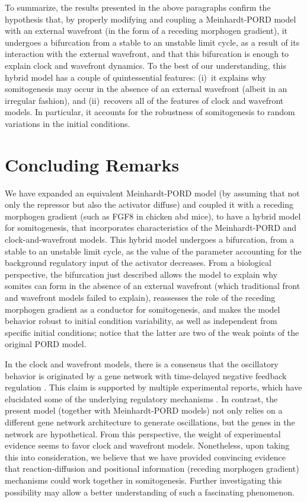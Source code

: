 \documentclass[%
 preprint,
 aip, 
 amsmath,amssymb,
]{revtex4-2}
\begin{document}
To summarize, the results presented in the above paragraphs confirm the hypothesis that, by properly modifying and coupling a Meinhardt-PORD model with an external wavefront (in the form of a receding morphogen gradient), it undergoes a bifurcation from a stable to an unstable limit cycle, as a result of its interaction with the external wavefront, and that this bifurcation is enough to explain clock and wavefront dynamics. To the best of our understanding, this hybrid model has a couple of quintessential features: (i)~it explains why somitogenesis may occur in the absence of an external wavefront (albeit in an irregular fashion), and (ii)~recovers all of the features of clock and wavefront models. In particular, it accounts for the robustness of somitogenesis to random variations in the initial conditions.
	
	
	\section{Concluding Remarks}
	\label{conclu}
	
We have expanded an equivalent Meinhardt-PORD model (by assuming that not only the repressor but also the activator diffuse) and coupled it with a receding morphogen gradient (such as FGF8 in chicken abd mice), to have a hybrid model for somitogenesis, that incorporates characteristics of the Meinhardt-PORD and clock-and-wavefront models.  This hybrid model undergoes a bifurcation, from a stable to an unstable limit cycle, as the value of the parameter accounting for the background regulatory input of the activator decreases. From a biological perspective, the bifurcation just described allows the model to explain why somites can form in the absence of an external wavefront (which traditional front and wavefront models failed to explain), reassesses the role of the receding morphogen gradient as a conductor for somitogenesis, and makes the model behavior robust to initial condition variability, as well as independent from specific initial conditions; notice that the latter are two of the weak points of the original PORD model. 
	
	In the clock and wavefront models, there is a consensus that the oscillatory behavior is originated by a gene network with time-delayed negative feedback regulation \cite{Monk2003, Lewis2003}. This claim is supported by multiple experimental reports, which have elucidated some of the underlying regulatory mechanisms \cite{Schroter2012}. In contrast, the present model (together with Meinhardt-PORD models) not only relies on a different gene network architecture to generate oscillations, but the genes in the network are hypothetical. From this perspective, the weight of experimental evidence seems to favor clock and wavefront models. Nonetheless, upon taking this into consideration, we believe that we have provided convincing evidence that reaction-diffusion and positional information (receding morphogen gradient) mechanisms could work together in somitogenesis. Further investigating this possibility may allow a better understanding of such a fascinating phenomenon.
	
\end{document}

